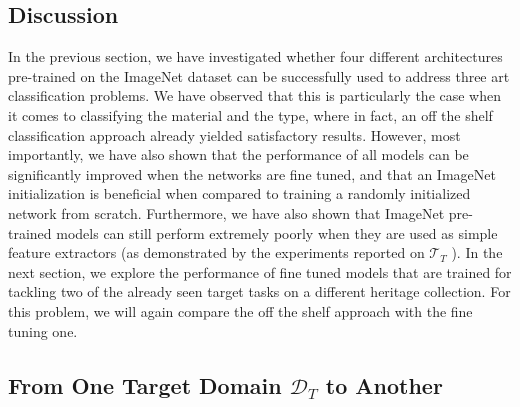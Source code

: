 

\subsection{Discussion}
\label{subsec: RijksDiscussion}
In the previous section, we have investigated whether four different architectures pre-trained on the ImageNet dataset can be successfully used to address three art classification problems. We have observed that this is particularly the case when it comes to classifying the material and the type, where in fact, an off the shelf classification approach already yielded satisfactory results. However, most importantly, we have also shown that the performance of all models can be significantly improved when the networks are fine tuned, and that an ImageNet initialization is beneficial when compared to training a randomly initialized network from scratch. Furthermore, we have also shown that ImageNet pre-trained models can still perform extremely poorly when they are used as simple feature extractors (as demonstrated by the experiments reported on $\mathcal{T}_T$ ). In the next section, we explore the performance of fine tuned models that are trained for tackling two of the already seen target tasks on a different heritage collection. For this problem, we will again compare the off the shelf approach with the fine tuning one.

\subsection{From One Target Domain $\mathcal{D}_T$ to Another} 
\label{subsec: from_one_to_another}


